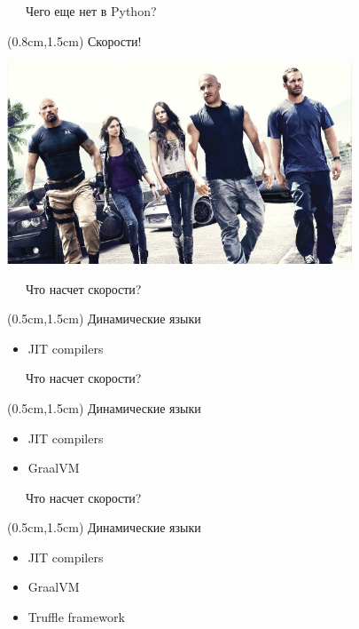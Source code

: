 \documentclass[xetex,18pt,aspectratio=43]{beamer}
\begin{document}
\begin{Large}
\begin{frame}{\ \ \ Чего еще нет в Python?}
\begin{textblock*}{\framewidth}(0.8cm,1.5cm)
Скорости!
\begin{minipage}{\textwidth}
  \centering
  \includegraphics[height=6.0cm]{img/ff}
\end{minipage}
\end{textblock*}
\end{frame}

\begin{frame}{\ \ \ Что насчет скорости?}
\begin{textblock*}{\framewidth}(0.5cm,1.5cm)
  Динамические языки
\begin{itemize}
  \item JIT compilers
\end{itemize}
\end{textblock*}
\end{frame}

\begin{frame}{\ \ \ Что насчет скорости?}
\begin{textblock*}{\framewidth}(0.5cm,1.5cm)
  Динамические языки
\begin{itemize}
  \item JIT compilers
  \item GraalVM
\end{itemize}
\end{textblock*}
\end{frame}

\begin{frame}{\ \ \ Что насчет скорости?}
\begin{textblock*}{\framewidth}(0.5cm,1.5cm)
  Динамические языки
\begin{itemize}
  \item JIT compilers
  \item GraalVM
  \item Truffle framework
\end{itemize}
\end{textblock*}
\end{frame}


\end{Large}
\end{document}
